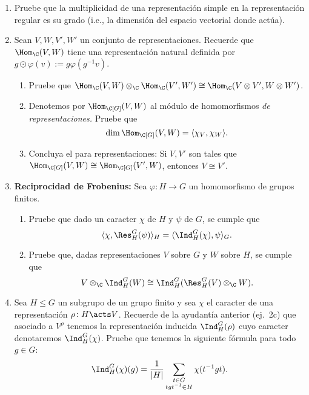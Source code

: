 \documentclass[11pt, reqno]{amsart}
\begin{document}
\begin{enumerate}
	\item Pruebe que la multiplicidad de una representación simple en la representación regular es su grado (i.e., la dimensión del espacio vectorial donde actúa).

		\newex
	\item Sean $V, W, V', W'$ un conjunto de representaciones.
		Recuerde que $\Hom_\C(V, W)$ tiene una representación natural definida por $g\odot\varphi(v) := g \varphi(g^{-1}v)$.
		\begin{enumerate}
			\item Pruebe que $\Hom_\C(V, W) \otimes_\C \Hom_\C(V', W') \cong \Hom_\C(V \otimes V', W \otimes W')$.

			\item Denotemos por $\Hom_{\C[G]}(V, W)$ al módulo de homomorfismos \emph{de representaciones.}
				Pruebe que
				\[
					\dim\Hom_{\C[G]}(V, W) = \langle \chi_V, \chi_W \rangle.
				\]
				
			\item Concluya el  para representaciones:
				Si $V, V'$ son tales que $\Hom_{\C[G]}(V, W) \cong \Hom_{\C[G]}(V', W)$, entonces $V \cong V'$.
		\end{enumerate}

		\newex
	\item \textbf{Reciprocidad de Frobenius:}
		Sea $\varphi \colon H \to G$ un homomorfismo de grupos finitos.
		\begin{enumerate}
			\item Pruebe que dado un caracter $\chi$ de $H$ y $\psi$ de $G$, se cumple que
				\[
					\textstyle
					\langle \chi, \Res_H^G(\psi) \rangle_H = \langle \Ind_H^G(\chi), \psi \rangle_G.
				\]

			\item Pruebe que, dadas representaciones $V$ sobre $G$ y $W$ sobre $H$, se cumple que
				\[
					\textstyle
					V \otimes_\C \Ind_H^G(W) \cong \Ind_H^G(\Res_H^G(V) \otimes_\C W).
				\]
		\end{enumerate}

		\newex
	\item Sea $H \le G$ un subgrupo de un grupo finito y sea $\chi$ el caracter de una representación $\rho \colon H \acts V$.
		Recuerde de la ayudantía anterior (ej.~2c) que asociado a $V^\rho$ tenemos la representación inducida $\Ind^G_H(\rho)$ cuyo
		caracter denotaremos $\Ind^G_H(\chi)$.
		Pruebe que tenemos la siguiente fórmula para todo $g \in G$:
		\[
			\Ind_H^G(\chi)(g) = \frac{1}{|H|} \sum_{\substack{t\in G \\ tgt^{-1} \in H}} \chi(t^{-1}gt).
		\]
		\nocite{serre:representations}


\end{enumerate}
\end{document}
